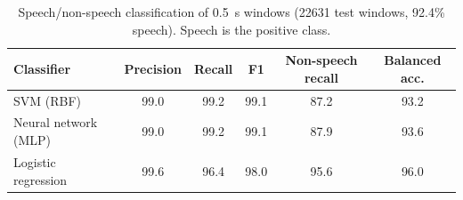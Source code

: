 \begin{table}[H]\centering\small\caption{Speech/non-speech classification of 0.5~s windows (22631 test windows, 92.4\% speech). Speech is the positive class.}\label{tab:win}
\begin{tabular}{lccccc}\toprule Classifier & Precision & Recall & F1 & Non-speech recall & Balanced acc.\\\midrule
SVM (RBF) & 99.0 & 99.2 & 99.1 & 87.2 & 93.2\\
Neural network (MLP) & 99.0 & 99.2 & 99.1 & 87.9 & 93.6\\
Logistic regression & 99.6 & 96.4 & 98.0 & 95.6 & 96.0\\
\bottomrule\end{tabular}\end{table}
